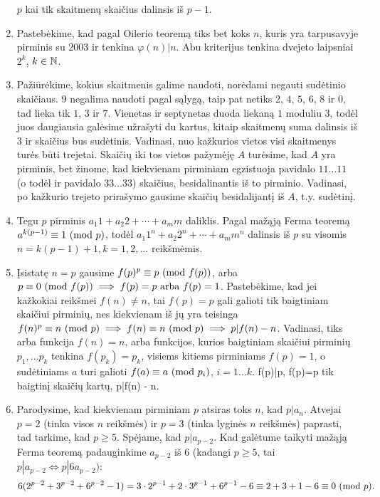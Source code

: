 \begin{enumerate}
    $p$ kai tik skaitmenų skaičius dalinsis iš $p-1$.
\item
    Pastebėkime, kad pagal Oilerio teoremą tiks bet koks $n$, kuris yra
    tarpusavyje pirminis su $2003$ ir tenkina $\varphi(n)|n$. Abu
    kriterijus tenkina dvejeto laipsniai $2^k$, $k\in \mathbb N$.
\item
    Pažiūrėkime, kokius skaitmenis galime naudoti, norėdami negauti
    sudėtinio skaičiaus. $9$ negalima naudoti pagal sąlygą, taip pat
    netiks $2$, $4$, $5$, $6$, $8$ ir $0$, tad lieka tik $1$, $3$ ir $7$.
    Vienetas ir septynetas duoda liekaną $1$ moduliu $3$, todėl juos
    daugiausia galėsime užrašyti du kartus, kitaip skaitmenų suma dalinsis
    iš $3$ ir skaičius bus sudėtinis. Vadinasi, nuo kažkurios vietos visi
    skaitmenys turės būti trejetai. Skaičių iki tos vietos pažymėję $A$
    turėsime, kad $A$ yra pirminis, bet žinome, kad kiekvienam pirminiam
    egzistuoja pavidalo $11\dots11$ (o todėl ir pavidalo $33\dots33$)
    skaičius, besidalinantis iš to pirminio. Vadinasi, po kažkurio trejeto
    prirašymo gausime skaičių besidalijantį iš $A$, t.y. sudėtinį.
\item
    Tegu $p$ pirminis $a_1 1 + a_2 2 + \cdots + a_m m$ daliklis.  Pagal
    mažąją Ferma teoremą $a^{k(p-1)}  \equiv 1 \ (\text{mod } p)$, todėl $a_1 1^n + a_2
    2^n + \cdots + a_m m^n$ dalinsis iš $p$ su visomis $n = k(p-1) + 1,
    k=1,2, \dots$ reikšmėmis.  
\item
    Įsistatę $n=p$ gausime $f(p)^p\equiv p \ (\text{mod } f(p))$, arba $p\equiv 0
    \ (\text{mod } f(p)) \implies f(p) = p \text{ arba } f(p) = 1$. Pastebėkime, kad
    jei kažkokiai reikšmei $f(n) \neq n$, tai $f(p) = p$ gali galioti tik
    baigtiniam skaičiui pirminių, nes kiekvienam iš jų yra teisinga
    $f(n)^p \equiv n \ (\text{mod } p) \implies f(n)\equiv n \ (\text{mod } p) \implies p|f(n) -
    n$. Vadinasi, tiks arba funkcija $f(n) = n$, arba funkcijos, kurios
    baigtiniam skaičiui pirminių $p_1, \ldots p_k$ tenkina $f(p_k) = p_k$,
    visiems kitiems pirminiams $f(p)=1$, o sudėtiniams $a$ turi galioti
    $f(a) \equiv a \ (\text{mod } p_i)$, $i=1\ldots k$.
    f(p)|p, f(p)=p tik baigtinį skaičių kartų, p|f(n) - n. 
\item
    Parodysime, kad kiekvienam pirminiam $p$ atsiras toks $n$, kad
    $p|a_n$. Atvejai $p=2$ (tinka visos $n$ reikšmės) ir $p=3$ (tinka
    lyginės $n$ reikšmės) paprasti, tad tarkime, kad $p\geq 5$. Spėjame,
    kad $p|a_{p-2}$. Kad galėtume taikyti mažąją Ferma teoremą
    padauginkime $a_{p-2}$ iš $6$ (kadangi $p\geq 5$, tai $p|a_{p-2} \iff
    p|6a_{p-2})$: $$6(2^{p-2} + 3^{p-2} + 6^{p-2} - 1) = 3\cdot 2^{p-1} +
    2\cdot 3^{p-1} + 6^{p-1} - 6 \equiv 2 + 3 + 1 - 6 \equiv 0 \ (\text{mod } p).$$
\end{enumerate} 
